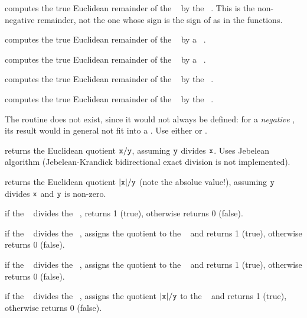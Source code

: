 computes the true Euclidean
remainder of the ~ by the ~. This is the
non-negative remainder, not the one whose sign is the sign of 
as in the  functions.

 computes the true Euclidean
remainder of the ~ by a ~.

 computes the true Euclidean
remainder of the ~ by a ~.

 computes the true Euclidean
remainder of the ~ by the ~.

 computes the true Euclidean
remainder of the ~ by the ~.

The routine  does not exist, since it would not always be
defined: for a \emph{negative} , its result  would
in general not fit into a . Use either  or
.


 returns the Euclidean quotient
${\tt x} / {\tt y}$, assuming ${\tt y}$ divides ${\tt x}$. Uses Jebelean
algorithm (Jebelean-Krandick bidirectional exact division is not
implemented).

 returns the Euclidean quotient
$|{\tt x}| / {\tt y}$ (note the absolue value!), assuming ${\tt y}$ divides
${\tt x}$ and ${\tt y}$ is non-zero.

 if the ~ divides the
~, returns 1 (true), otherwise returns 0 (false).

 if the ~ divides the
~, assigns the quotient to the ~ and returns 1
(true), otherwise returns 0 (false).

 if the ~ divides the
~, assigns the quotient to the ~ and returns 1
(true), otherwise returns 0 (false).

 if the ~ divides
the ~, assigns the quotient $|{\tt x}|/{\tt y}$ to the
~ and returns 1 (true), otherwise returns 0 (false).

